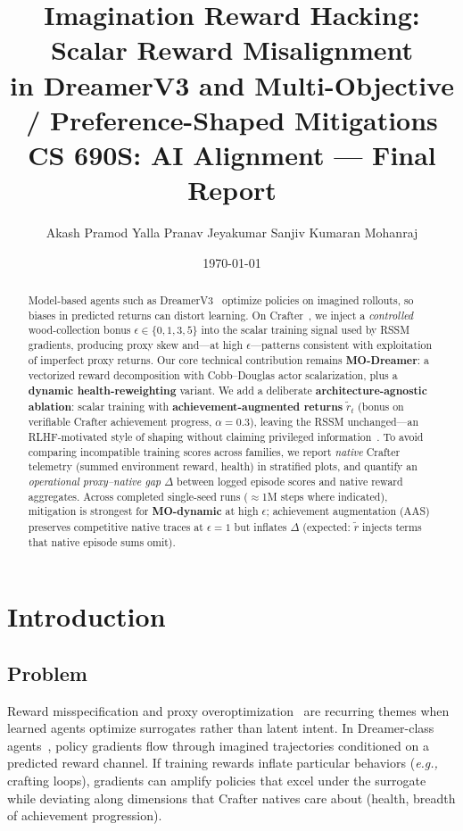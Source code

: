 \documentclass[10pt,twocolumn]{article}
\title{\textbf{Imagination Reward Hacking: Scalar Reward Misalignment\\
in DreamerV3 and Multi-Objective / Preference-Shaped Mitigations}\\[0.35em]
\large CS 690S: AI Alignment --- Final Report}
\author{Akash Pramod Yalla \quad Pranav Jeyakumar \quad Sanjiv Kumaran Mohanraj}
\date{\today}
\theoremstyle{definition}
\begin{document}
\maketitle

\begin{abstract}
Model-based agents such as DreamerV3~\cite{hafner2023dreamerv3} optimize policies on imagined rollouts, so biases in predicted returns can distort learning. On Crafter~\cite{hafner2021crafter}, we inject a \emph{controlled} wood-collection bonus \(\epsilon\in\{0,1,3,5\}\) into the scalar training signal used by RSSM gradients, producing proxy skew and---at high \(\epsilon\)---patterns consistent with exploitation of imperfect proxy returns. Our core technical contribution remains \textbf{MO-Dreamer}: a vectorized reward decomposition with Cobb--Douglas actor scalarization, plus a \textbf{dynamic health-reweighting} variant. We add a deliberate \textbf{architecture-agnostic ablation}: scalar training with \textbf{achievement-augmented returns} \(\tilde r_t\) (bonus on verifiable Crafter achievement progress, \(\alpha{=}0.3\)), leaving the RSSM unchanged---an RLHF-motivated style of shaping without claiming privileged information~\cite{christiano2017rlhf}. To avoid comparing incompatible training scores across families, we report \emph{native} Crafter telemetry (summed environment reward, health) in stratified plots, and quantify an \emph{operational proxy--native gap} \(\Delta\) between logged episode scores and native reward aggregates. Across completed single-seed runs (\(\approx\)1M steps where indicated), mitigation is strongest for \textbf{MO-dynamic} at high \(\epsilon\); achievement augmentation (AAS) preserves competitive native traces at \(\epsilon{=}1\) but inflates \(\Delta\) (expected: \(\tilde r\) injects terms that native episode sums omit).
\end{abstract}

\section{Introduction}
\subsection{Problem}
Reward misspecification and proxy overoptimization~\cite{gao2022scaling} are recurring themes when learned agents optimize surrogates rather than latent intent. In Dreamer-class agents~\cite{hafner2023dreamerv3}, policy gradients flow through imagined trajectories conditioned on a predicted reward channel. If training rewards inflate particular behaviors (\emph{e.g.,} crafting loops), gradients can amplify policies that excel under the surrogate while deviating along dimensions that Crafter natives care about (health, breadth of achievement progression).
\end{document}
